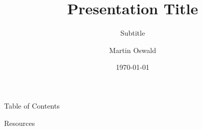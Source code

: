 \documentclass[
10pt, 
xcolor=x11names,
aspectratio=169,
]{beamer}
\title{Presentation Title}
\subtitle{Subtitle}
\author{Martin Oswald}
\date{\today}
\begin{document}
\frame[plain]{\titlepage}

\begin{frame}{Table of Contents}
\tableofcontents
\end{frame}




\begin{frame}[allowframebreaks]{Resources}
\printbibliography
\end{frame}

\end{document}
